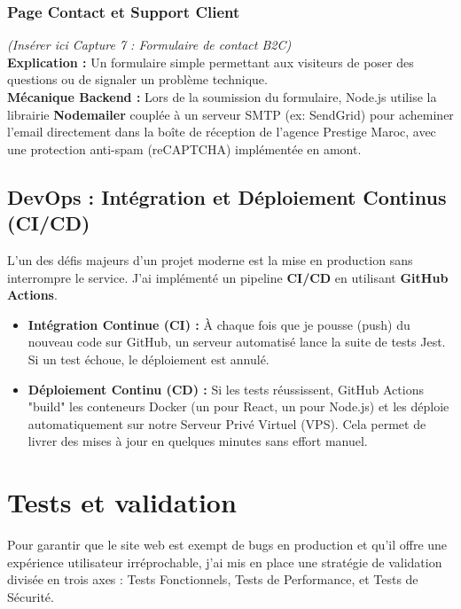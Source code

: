 \documentclass[12pt, a4paper]{report}
\begin{document}
\subsection{Page Contact et Support Client}
\textit{(Insérer ici Capture 7 : Formulaire de contact B2C)} \\
\textbf{Explication :} Un formulaire simple permettant aux visiteurs de poser des questions ou de signaler un problème technique. \\
\textbf{Mécanique Backend :} Lors de la soumission du formulaire, Node.js utilise la librairie \textbf{Nodemailer} couplée à un serveur SMTP (ex: SendGrid) pour acheminer l'email directement dans la boîte de réception de l'agence Prestige Maroc, avec une protection anti-spam (reCAPTCHA) implémentée en amont.

\section{DevOps : Intégration et Déploiement Continus (CI/CD)}
L'un des défis majeurs d'un projet moderne est la mise en production sans interrompre le service. J'ai implémenté un pipeline \textbf{CI/CD} en utilisant \textbf{GitHub Actions}.
\begin{itemize}
    \item \textbf{Intégration Continue (CI) :} À chaque fois que je pousse (push) du nouveau code sur GitHub, un serveur automatisé lance la suite de tests Jest. Si un test échoue, le déploiement est annulé.
    \item \textbf{Déploiement Continu (CD) :} Si les tests réussissent, GitHub Actions "build" les conteneurs Docker (un pour React, un pour Node.js) et les déploie automatiquement sur notre Serveur Privé Virtuel (VPS). Cela permet de livrer des mises à jour en quelques minutes sans effort manuel.
\end{itemize}

\chapter{Tests et validation}

Pour garantir que le site web est exempt de bugs en production et qu'il offre une expérience utilisateur irréprochable, j'ai mis en place une stratégie de validation divisée en trois axes : Tests Fonctionnels, Tests de Performance, et Tests de Sécurité.
\end{document}
